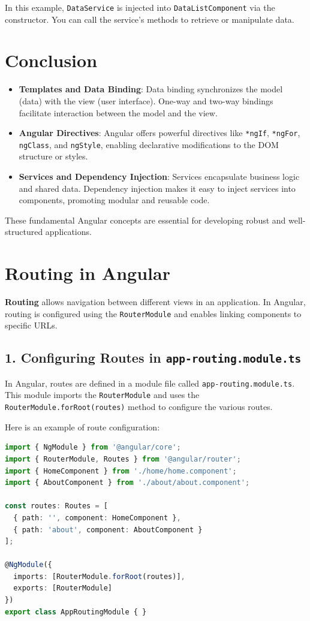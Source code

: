 \documentclass{article}
\begin{document}
In this example, \texttt{DataService} is injected into \texttt{DataListComponent} via the constructor. You can call the service's methods to retrieve or manipulate data. 

\section{Conclusion}

\begin{itemize}
  \item \textbf{Templates and Data Binding}: Data binding synchronizes the model (data) with the view (user interface). One-way and two-way bindings facilitate interaction between the model and the view.
  \item \textbf{Angular Directives}: Angular offers powerful directives like \texttt{*ngIf}, \texttt{*ngFor}, \texttt{ngClass}, and \texttt{ngStyle}, enabling declarative modifications to the DOM structure or styles.
  \item \textbf{Services and Dependency Injection}: Services encapsulate business logic and shared data. Dependency injection makes it easy to inject services into components, promoting modular and reusable code.
\end{itemize}

These fundamental Angular concepts are essential for developing robust and well-structured applications.
\section*{Routing in Angular}

\textbf{Routing} allows navigation between different views in an application. In Angular, routing is configured using the \texttt{RouterModule} and enables linking components to specific URLs.

\subsection*{1. Configuring Routes in \texttt{app-routing.module.ts}}

In Angular, routes are defined in a module file called \texttt{app-routing.module.ts}. This module imports the \texttt{RouterModule} and uses the \texttt{RouterModule.forRoot(routes)} method to configure the various routes.

Here is an example of route configuration:
\begin{lstlisting}[language=TypeScript, caption={Route Configuration Example}, label={lst:typescript-route-config}]
import { NgModule } from '@angular/core';
import { RouterModule, Routes } from '@angular/router';
import { HomeComponent } from './home/home.component';
import { AboutComponent } from './about/about.component';

const routes: Routes = [
  { path: '', component: HomeComponent },
  { path: 'about', component: AboutComponent }
];

@NgModule({
  imports: [RouterModule.forRoot(routes)],
  exports: [RouterModule]
})
export class AppRoutingModule { }
\end{lstlisting}
\end{document}
